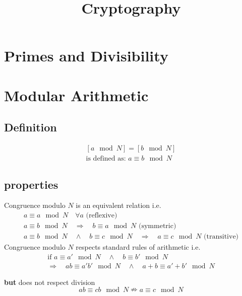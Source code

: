\documentclass[a4paper]{article}
\begin{document}
\title{Cryptography}
\section{Primes and Divisibility} 
\section{Modular Arithmetic}
\subsection{Definition}
\begin{equation}
    \begin{split}
	[a \mod N] = [b \mod N] \\
	\text{is defined as: } a \equiv b \mod N
    \end{split}
    \label{modulo_definition}
\end{equation}

\subsection{properties}
Congruence modulo $N$ is an equivalent relation i.e.
\begin{equation}
    \begin{split}
	a \equiv a \mod N  \quad \forall  a \text{ (reflexive)} \\
	a \equiv b \mod N \quad\Rightarrow\quad b \equiv a \mod N \text{ (symmetric)}\\
	a \equiv b \mod N  \quad\wedge\quad  b \equiv c \mod N \quad\Rightarrow\quad a \equiv c \mod N \text{ (transitive)}
    \end{split}
    \label{modulo_equivalent_relation}
\end{equation}
Congruence modulo $N$ respects standard rules of arithmetic i.e.
\begin{equation}
    \begin{split}
	\text{if }a \equiv a' \mod N \quad\wedge\quad b \equiv b' \mod N \\
	\Rightarrow\quad ab \equiv a'b' \mod N \quad\wedge\quad a+b \equiv a'+b' \mod N
    \end{split}
    \label{modulo_arithmetic_rules}
\end{equation}

\textbf{but} does not respect division
\begin{equation}
    ab \equiv cb \mod N \nRightarrow a \equiv c \mod N 
    \label{modulo_arithmetic_division}
\end{equation}
\end{document}
